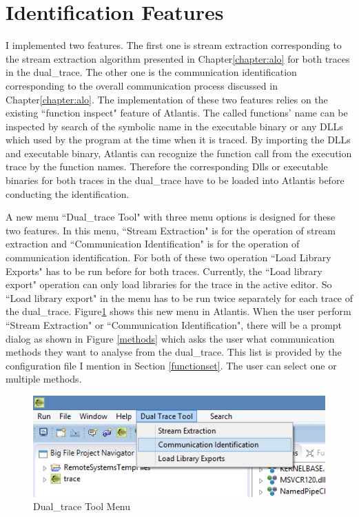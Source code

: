 \section{Identification Features}
I implemented two features. The first one is stream extraction corresponding to the stream extraction algorithm presented in Chapter\ref{chapter:alo} for both traces in the dual\_trace. The other one is the communication identification corresponding to the overall communication process discussed in Chapter\ref{chapter:alo}. The implementation of these two features relies on the existing ``function inspect" feature of Atlantis. The called functions' name can be inspected  by  search of the symbolic name in the executable binary or any DLLs which used by the program at the time when it is traced. By importing the DLLs and executable binary, Atlantis can recognize the function call from the execution trace by the function names. Therefore the corresponding Dlls or executable binaries for both traces in the dual\_trace have to be loaded into Atlantis before conducting the identification.

A new menu ``Dual\_trace Tool" with three menu options is designed for these two features. In this menu, ``Stream Extraction" is for the operation of stream extraction and ``Communication Identification" is for the operation of communication identification. For both of these two operation ``Load Library Exports" has to be run before for both traces. Currently, the ``Load library export"  operation can only load libraries for the trace in the active editor. So ``Load library export"  in the menu has to be run twice separately for each trace of the dual\_trace.  Figure\ref{dualtracetoolmenu} shows this new menu in Atlantis. When the user perform ``Stream Extraction" or ``Communication Identification", there will be a prompt dialog as shown in Figure \ref{methods} which asks the user what communication methods they want to analyse from the dual\_trace. This list is provided by the configuration file I mention in Section \ref{functionset}. The user can select one or multiple methods. 

\begin{figure}[H]
\centerline{\includegraphics{Figures/dualtracetoolmenu}}
 \caption{Dual\_trace Tool Menu}
\label{dualtracetoolmenu}
\end{figure}

